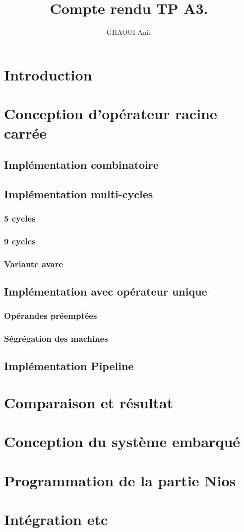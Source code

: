 \documentclass[12pt,a4paper]{article}
\author{GHAOUI Anis}
\title{Compte rendu TP A3.}
\begin{document}

\section{Introduction}
\section{Conception d'opérateur racine carrée}

\subsection{Implémentation combinatoire}
\subsection{Implémentation multi-cycles}

\subsubsection{5 cycles}
\subsubsection{9 cycles}
\subsubsection{Variante avare} %

\subsection{Implémentation avec opérateur unique}
\subsubsection{Opérandes préemptées}
\subsubsection{Ségrégation des machines} %

\subsection{Implémentation Pipeline} %

\section{Comparaison et résultat}

\section{Conception du système embarqué} %
\section{Programmation de la partie Nios}
\section{Intégration etc } %
	
\end{document}
